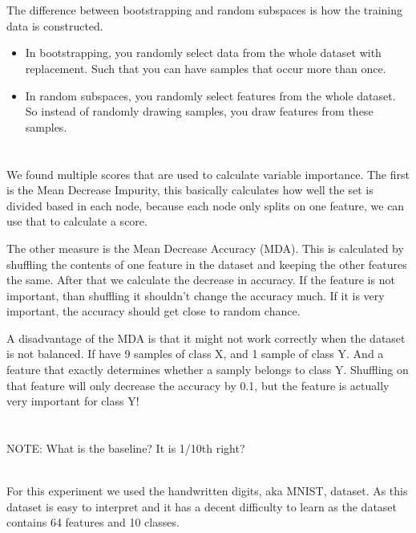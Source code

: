 \documentclass[11pt]{article}
\begin{document}
\section{}
The difference between bootstrapping and random subspaces is how the training data is constructed. 
\begin{itemize}
	\item In bootstrapping, you randomly select data from the whole dataset with replacement. Such that you can have samples that occur more than once.
	\item In random subspaces, you randomly select features from the whole dataset. So instead of randomly drawing samples, you draw features from these samples.
\end{itemize}


\section{}
We found multiple scores that are used to calculate variable importance. The first is the Mean Decrease Impurity, this basically calculates how well the set is divided based in each node, because each node only splits on one feature, we can use that to calculate a score.

The other measure is the Mean Decrease Accuracy (MDA). This is calculated by shuffling the contents of one feature in the dataset and keeping the other features the same. After that we calculate the decrease in accuracy. If the feature is not important, than shuffling it shouldn't change the accuracy much. If it is very important, the accuracy should get close to random chance. 

A disadvantage of the MDA is that it might not work correctly when the dataset is not balanced. If have 9 samples of class X, and 1 sample of class Y. And a feature that exactly determines whether a samply belongs to class Y. Shuffling on that feature will only decrease the accuracy by 0.1, but the feature is actually very important for class Y!

\section{}
NOTE: What is the baseline? It is 1/10th right?

~\\
For this experiment we used the handwritten digits, aka MNIST, dataset. As this dataset is easy to interpret and it has a decent difficulty to learn as the dataset contains 64 features and 10 classes.
\end{document}
